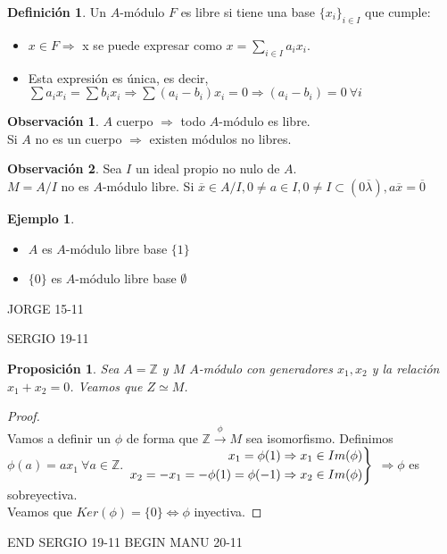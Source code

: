 \documentclass{article}
\newenvironment{rcases}
{\left.\begin{aligned}}
	{\end{aligned}\right\rbrace}
\theoremstyle{theorem-style}  %
\newtheorem{proposition}[theorem]{Proposición}
\theoremstyle{definition}
\newtheorem{definition}{Definición}[section]
\newtheorem*{observation}{Observación} %
\theoremstyle{example-style}
\newtheorem{example}{Ejemplo}[section]
\begin{document}
\begin{definition}
	Un $ A $-módulo $ F $ es libre si tiene una base $\{x_i\}_{i\in I}$ que cumple:
	\begin{itemize}
		\item $x\in F\Rightarrow$ x se puede expresar como $x=\sum_{i\in I}a_i x_i$.
		\item Esta expresión es única, es decir, $\sum a_i x_i=\sum b_i x_i \Rightarrow \sum (a_i-b_i)x_i=0\Rightarrow (a_i-b_i)=0 \ \forall i$
	\end{itemize}
\end{definition}
\begin{observation}
	$ A $ cuerpo $ \Rightarrow $ todo $ A $-módulo es libre. \\
	Si $ A $ no es un cuerpo $ \Rightarrow $ existen módulos no libres.
\end{observation}
\begin{observation}
	Sea $ I $ un ideal propio no nulo de $ A $.\\
	$ M=A/I $ no es $ A $-módulo libre.
	Si $ \overline{x} \in A/I, 0\neq a\in I, 0\neq I \subset (0\overline{\lambda}), a\overline{x}=\overline{0} $
\end{observation}
\begin{example}
	\begin{itemize}
		\item $ A $ es $ A $-módulo libre base $ \{1\} $
		\item $ \{0\} $ es $ A $-módulo libre base $ \emptyset $
	\end{itemize}
\end{example}
JORGE 15-11

SERGIO 19-11

\begin{proposition}
	Sea $A=\mathbb{Z}$ y $M$ $A$-módulo con generadores $x_1,x_2$ y la relación $x_1+x_2=0$. Veamos que $Z\simeq M$.
\end{proposition}

\begin{proof}
	\ \\
	Vamos a definir un $\phi$ de forma que $\mathbb{Z}\xrightarrow{\ \phi\ }M$ sea isomorfismo.
	Definimos $\phi(a)=ax_1 \ \forall a \in \mathbb{Z}$.
	$\begin{rcases}
		x_1=\phi(1)\Rightarrow x_1\in Im(\phi) \\
		x_2=-x_1=-\phi(1)=\phi(-1)\Rightarrow x_2 \in Im(\phi)
	\end{rcases}$
	$\Rightarrow \phi$ es sobreyectiva. \\
	Veamos que $Ker(\phi)=\{0\}\Leftrightarrow \phi$ inyectiva.
\end{proof}
END SERGIO 19-11
BEGIN MANU 20-11
\end{document}
